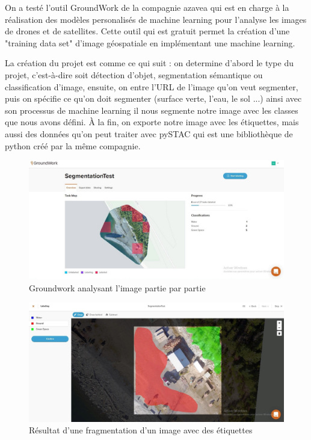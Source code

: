 \documentclass[12pt, openany]{report}
\begin{document}
On a testé l'outil GroundWork de la compagnie azavea qui est en charge à la réalisation des modèles personalisés de machine learning pour l'analyse les images de drones et de satellites.
Cette outil qui est gratuit permet la création d'une "training data set" d'image géospatiale en implémentant une machine learning.
\par
La création du projet est comme ce qui suit : on determine d'abord le type du projet, c'est-à-dire  soit détection d'objet, segmentation sémantique ou classification d'image, ensuite, on entre l'URL de l'image qu'on veut segmenter, puis on spécifie ce qu'on doit segmenter (surface verte, l'eau, le sol ...) ainsi avec son processus de machine learning il nous segmente notre image avec les classes que nous avons défini.
À la fin, on exporte notre image avec les étiquettes, mais aussi des données qu'on peut traiter avec pySTAC qui est une bibliothèque de python créé par la même compagnie.

\begin{figure}[H]
\centering
\includegraphics[scale=0.4]{groundwork_screen1.jpg}
\caption{Groundwork analysant l'image partie par partie}
\end{figure}

\begin{figure}[H]
\centering
\includegraphics[scale=0.4]{groundwork_screen2.jpg}
\caption{Résultat d'une fragmentation d'un image avec des étiquettes}
\end{figure}
\end{document}
